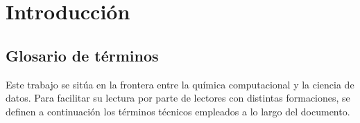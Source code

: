 
\section{Introducci\'on}
\label{sec:introduccion}

\subsection{Glosario de t\'erminos}
\label{subsec:glosario}

Este trabajo se sit\'ua en la frontera entre la qu\'imica computacional y la ciencia de datos.
Para facilitar su lectura por parte de lectores con distintas formaciones, se definen
a continuaci\'on los t\'erminos t\'ecnicos empleados a lo largo del documento.

